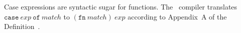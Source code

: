 \begin{node}[Remark]\label{sml-000K}%
Case expressions are syntactic sugar for functions. The \SML\ compiler
translates $\mathtt{case}~exp~\mathtt{of}~match$ to $(\mathtt{fn}~match)~exp$
according to Appendix~A of the Definition~\cite{milner1997definition}.
\end{node}
